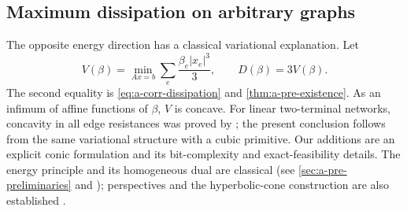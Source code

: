 \subsection{Maximum dissipation on arbitrary graphs}

The opposite energy direction has a classical variational explanation.
Let
\begin{equation}
 V(\beta)=\min_{Ax=b}\sum_e\frac{\beta_e|x_e|^3}{3},
 \qquad D(\beta)=3V(\beta).
 \label{eq:a-corr-primitive}
\end{equation}
The second equality is \cref{eq:a-corr-dissipation} and
\cref{thm:a-pre-existence}. As an infimum of affine functions of
$\beta$, $V$ is concave. For linear two-terminal networks, concavity
in all edge resistances was proved by
\citet{shannon1956-concavity}; the present conclusion follows from the
same variational structure with a cubic primitive. Our additions are an
explicit conic formulation and its bit-complexity and exact-feasibility
details. The energy principle and its homogeneous dual are
classical (see \cref{sec:a-pre-preliminaries} and
\citet[Section 3, equation (7), and Lemma 3.4, equation (8)]{gro2017-algorithmic-results-for-potential-based});
perspectives and the hyperbolic-cone construction are also established
\citep[Section 3.2.6]{boyd2004-convex}
\citep[Section 2.3]{lobo1998-socp}.

